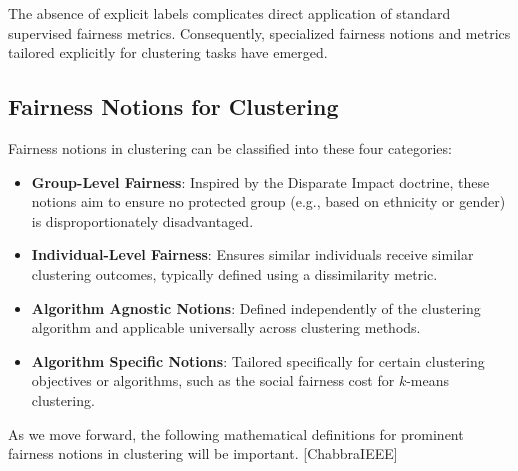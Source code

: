 The absence of explicit labels complicates direct application of
standard supervised fairness metrics. Consequently, specialized
fairness notions and metrics tailored explicitly for clustering tasks
have emerged.

\subsection{Fairness Notions for Clustering}
Fairness notions in clustering can be classified into these four categories:

\begin{itemize}
  \item \textbf{Group-Level Fairness}: Inspired by the Disparate
    Impact doctrine, these notions aim to ensure no protected group
    (e.g., based on ethnicity or gender) is disproportionately disadvantaged.
  \item \textbf{Individual-Level Fairness}: Ensures similar
    individuals receive similar clustering outcomes, typically
    defined using a dissimilarity metric.
  \item \textbf{Algorithm Agnostic Notions}: Defined independently of
    the clustering algorithm and applicable universally across
    clustering methods.
  \item \textbf{Algorithm Specific Notions}: Tailored specifically
    for certain clustering objectives or algorithms, such as the
    social fairness cost for \(k\)-means clustering.
\end{itemize}

As we move forward, the following mathematical definitions for prominent
fairness notions in clustering will be important.
[\cite{ChhabraOverview}ChabbraIEEE]

